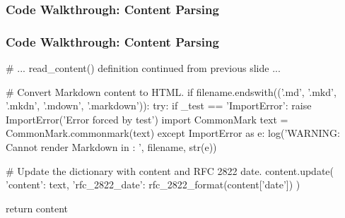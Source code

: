 \documentclass{beamer}
\begin{document}
\begin{frame}[fragile]
\frametitle{Code Walkthrough: Content Parsing}
\end{frame}


\begin{frame}[fragile]
\frametitle{Code Walkthrough: Content Parsing}
\begin{pythoncode}
    # ... read_content() definition continued from previous slide ... 

    # Convert Markdown content to HTML.
    if filename.endswith(('.md', '.mkd', '.mkdn', '.mdown', '.markdown')):
        try:
            if _test == 'ImportError':
                raise ImportError('Error forced by test')
            import CommonMark
            text = CommonMark.commonmark(text)
        except ImportError as e:
            log('WARNING: Cannot render Markdown in {}: {}', filename, str(e))

    # Update the dictionary with content and RFC 2822 date.
    content.update({
        'content': text,
        'rfc_2822_date': rfc_2822_format(content['date'])
    })

    return content
\end{pythoncode}
\end{frame}
\end{document}
